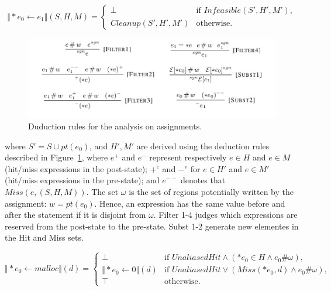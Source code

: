
\[
\Vert *e_0 \gets e_1 \Vert(S,H,M)=\begin{cases}
\bot& \text{if $Infeasible(S',H',M')$},\\
Cleanup(S',H',M')& \text{otherwise}.
\end{cases}
\]


\begin{figure}
  \centering
  \includegraphics[width=1.0\columnwidth]{figs/rules_assignment}
   \caption{Duduction rules for the analysis on assignments.}
   \label{fig:rule_ass}
\end{figure}

where $S'=S\cup pt(e_0)$, and $H',M'$ are derived using the deduction rules 
described in Figure~\ref{fig:rule_ass}, where $e^+$ and $e^-$ represent 
respectively $e\in H$ and $e\in M$ (hit/miss expressions in the post-state); 
$+^e$ and $-^e$ for $e\in H'$ and $e\in M'$ (hit/miss expressions in the 
pre-state); and $e^{--}$ denotes that $Miss(e,(S,H,M))$. The set $\omega$ is 
the set of regions potentially written by the assignment: $w=pt(e_0)$. Hence,
an expression has the same value before and after the statement if it is 
disjoint from $\omega$. 
Filter 1-4 judges which expressions are reserved from the post-state to the 
pre-state. Subst 1-2 generate new elementes in the Hit and Miss sets.



\[
\Vert *e_0 \gets malloc \Vert(d)=\begin{cases}
\bot& \text{if $UnaliasedHit \wedge (*e_0 \in H \wedge e_0\#\omega)$},\\
\Vert *e_0 \gets 0 \Vert (d)& 
  \text{if $UnaliasedHit \vee (Miss(*e_0,d) \wedge e_0\#\omega)$},\\
\top& \text{otherwise}.
\end{cases}
\]


